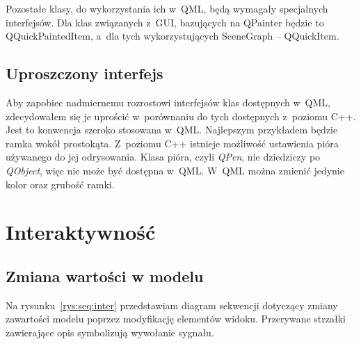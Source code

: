 Pozostałe klasy, do wykorzystania ich w~QML, będą wymagały specjalnych interfejsów. Dla klas związanych z~GUI, bazujących na QPainter będzie to QQuickPaintedItem, a~dla tych wykorzystujących SceneGraph -- QQuickItem.

\subsection{Uproszczony interfejs}
Aby zapobiec nadmiernemu rozrostowi interfejsów klas dostępnych w~QML, zdecydowałem się je uprościć w~porównaniu do tych dostępnych z~poziomu C++. Jest to konwencja szeroko stosowana w~QML. Najlepszym przykładem będzie ramka wokół prostokąta. Z~poziomu C++ istnieje możliwość ustawienia pióra używanego do jej odrysowania. Klasa pióra, czyli \textit{QPen}, nie dziedziczy po \textit{QObject}, więc nie może być dostępna w~QML. W~QML można zmienić jedynie kolor oraz grubość ramki.

\section{Interaktywność}

\subsection{Zmiana wartości w modelu}
Na rysunku~\ref{rys:seq:inter} przedstawiam diagram sekwencji dotyczący zmiany zawartości modelu poprzez modyfikację elementów widoku. Przerywane strzałki zawierające opis symbolizują wywołanie sygnału.

